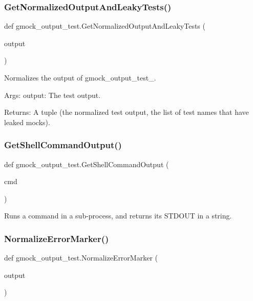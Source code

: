 \subsubsection{\texorpdfstring{GetNormalizedOutputAndLeakyTests()}{GetNormalizedOutputAndLeakyTests()}}
{\footnotesize\ttfamily def gmock\+\_\+output\+\_\+test.\+Get\+Normalized\+Output\+And\+Leaky\+Tests (\begin{DoxyParamCaption}\item[{}]{output }\end{DoxyParamCaption})}

\begin{DoxyVerb}Normalizes the output of gmock_output_test_.

Args:
  output: The test output.

Returns:
  A tuple (the normalized test output, the list of test names that have
  leaked mocks).
\end{DoxyVerb}
 \mbox{\label{namespacegmock__output__test_a001498a3e9bf552ee429e434eb00cb08}} 
\subsubsection{\texorpdfstring{GetShellCommandOutput()}{GetShellCommandOutput()}}
{\footnotesize\ttfamily def gmock\+\_\+output\+\_\+test.\+Get\+Shell\+Command\+Output (\begin{DoxyParamCaption}\item[{}]{cmd }\end{DoxyParamCaption})}

\begin{DoxyVerb}Runs a command in a sub-process, and returns its STDOUT in a string.\end{DoxyVerb}
 \mbox{\label{namespacegmock__output__test_af3c1f95f19b9f048843a2d562d459b24}} 
\subsubsection{\texorpdfstring{NormalizeErrorMarker()}{NormalizeErrorMarker()}}
{\footnotesize\ttfamily def gmock\+\_\+output\+\_\+test.\+Normalize\+Error\+Marker (\begin{DoxyParamCaption}\item[{}]{output }\end{DoxyParamCaption})}

